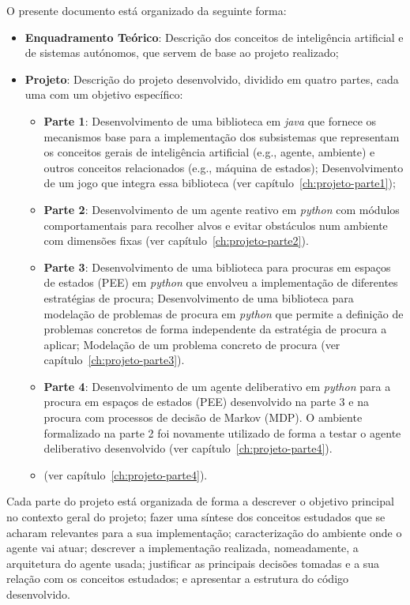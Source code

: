 O presente documento está organizado da seguinte forma:
\begin{itemize}
    \item \textbf{Enquadramento Teórico}: Descrição dos conceitos de inteligência artificial e de sistemas autónomos, que servem de base ao projeto realizado;
    \item \textbf{Projeto}: Descrição do projeto desenvolvido, dividido em quatro partes, cada uma com um objetivo específico:
    \begin{itemize}
        \item \textbf{Parte 1}: Desenvolvimento de uma biblioteca em \textit{java} que fornece os mecanismos base para a implementação dos subsistemas que representam os conceitos gerais de inteligência artificial (e.g., agente, ambiente) e outros conceitos relacionados (e.g., máquina de estados); Desenvolvimento de um jogo que integra essa biblioteca (ver capítulo~\ref{ch:projeto-parte1});
        \item \textbf{Parte 2}: Desenvolvimento de um agente reativo em \textit{python} com módulos comportamentais para recolher alvos e evitar obstáculos num ambiente com dimensões fixas (ver capítulo~\ref{ch:projeto-parte2}).
        \item \textbf{Parte 3}: Desenvolvimento de uma biblioteca para procuras em espaços de estados (PEE) em \textit{python} que envolveu a implementação de diferentes estratégias de procura; Desenvolvimento de uma biblioteca para modelação de problemas de procura em \textit{python} que permite a definição de problemas concretos de forma independente da estratégia de procura a aplicar; Modelação de um problema concreto de procura (ver capítulo~\ref{ch:projeto-parte3}).
        \item \textbf{Parte 4}: Desenvolvimento de um agente deliberativo em \textit{python} para a procura em espaços de estados (PEE) desenvolvido na parte 3 e na procura com processos de decisão de Markov (MDP).
        O ambiente formalizado na parte 2 foi novamente utilizado de forma a testar o agente deliberativo desenvolvido (ver capítulo~\ref{ch:projeto-parte4}).
        \item (ver capítulo~\ref{ch:projeto-parte4}).
    \end{itemize}
\end{itemize}

Cada parte do projeto está organizada de forma a descrever o objetivo principal no contexto geral do projeto; fazer uma síntese dos conceitos estudados que se acharam relevantes para a sua implementação; caracterização do ambiente onde o agente vai atuar; descrever a implementação realizada, nomeadamente, a arquitetura do agente usada; justificar as principais decisões tomadas e a sua relação com os conceitos estudados; e apresentar a estrutura do código desenvolvido.

